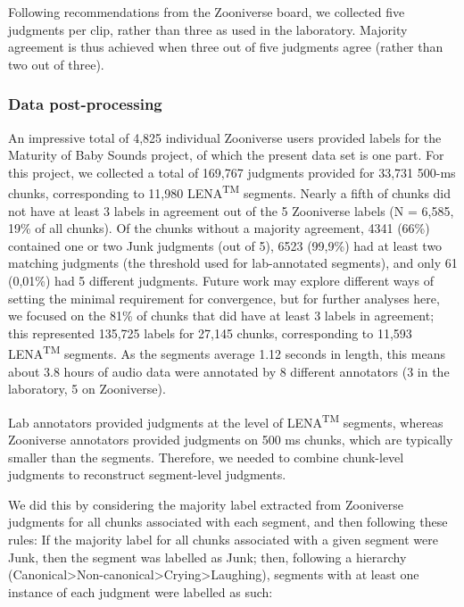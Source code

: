 \documentclass[english,,man]{apa6}
\begin{document}
Following recommendations from the Zooniverse board, we collected five judgments per clip, rather than three as used in the laboratory. Majority agreement is thus achieved when three out of five judgments agree (rather than two out of three).

\hypertarget{data-post-processing}{%
\subsubsection{Data post-processing}\label{data-post-processing}}

An impressive total of 4,825 individual Zooniverse users provided labels for the Maturity of Baby Sounds project, of which the present data set is one part. For this project, we collected a total of 169,767 judgments provided for 33,731 500-ms chunks, corresponding to 11,980 LENA\textsuperscript{TM} segments. Nearly a fifth of chunks did not have at least 3 labels in agreement out of the 5 Zooniverse labels (N = 6,585, 19\% of all chunks). Of the chunks without a majority agreement, 4341 (66\%) contained one or two Junk judgments (out of 5), 6523 (99,9\%) had at least two matching judgments (the threshold used for lab-annotated segments), and only 61 (0,01\%) had 5 different judgments. Future work may explore different ways of setting the minimal requirement for convergence, but for further analyses here, we focused on the 81\% of chunks that did have at least 3 labels in agreement; this represented 135,725 labels for 27,145 chunks, corresponding to 11,593 LENA\textsuperscript{TM} segments. As the segments average 1.12 seconds in length, this means about 3.8 hours of audio data were annotated by 8 different annotators (3 in the laboratory, 5 on Zooniverse).

Lab annotators provided judgments at the level of LENA\textsuperscript{TM} segments, whereas Zooniverse annotators provided judgments on 500 ms chunks, which are typically smaller than the segments. Therefore, we needed to combine chunk-level judgments to reconstruct segment-level judgments.

We did this by considering the majority label extracted from Zooniverse judgments for all chunks associated with each segment, and then following these rules: If the majority label for all chunks associated with a given segment were Junk, then the segment was labelled as Junk; then, following a hierarchy (Canonical\textgreater{}Non-canonical\textgreater{}Crying\textgreater{}Laughing), segments with at least one instance of each judgment were labelled as such:
\end{document}
